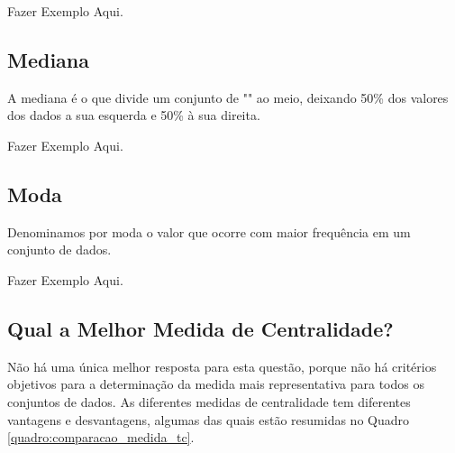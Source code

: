 \documentclass[11pt,fleqn]{book}
\numberwithin{mpicture}{chapter}
\numberwithin{mtable}{chapter}
\numberwithin{mframe}{chapter}
\begin{document}
{\color{red}Fazer Exemplo Aqui.}

\subsection{Mediana}

A mediana é o  que divide um conjunto de "" ao meio, deixando 50\% dos valores dos dados a sua esquerda e 50\% à sua direita.

{\color{red}Fazer Exemplo Aqui.}

\subsection{Moda}

Denominamos por moda o valor que ocorre com maior frequência em um conjunto de dados.

{\color{red}Fazer Exemplo Aqui.}

\subsection{Qual a Melhor Medida de Centralidade?}

Não há uma única melhor resposta para esta questão, porque não há critérios objetivos para a determinação da medida mais representativa para todos os conjuntos de dados. As diferentes medidas de centralidade tem diferentes vantagens e desvantagens, algumas das quais estão resumidas no Quadro \ref{quadro:comparacao_medida_tc}.\\
\end{document}
